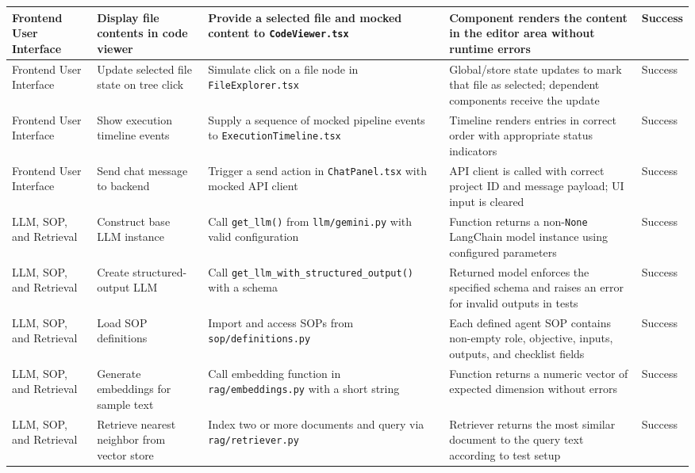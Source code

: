\begin{longtable}{|p{3.0cm}|p{3.8cm}|p{3.8cm}|p{4.6cm}|>{\centering\arraybackslash}p{1.8cm}|}
\hline
Frontend User Interface & Display file contents in code viewer & Provide a selected file and mocked content to \texttt{CodeViewer.tsx} & Component renders the content in the editor area without runtime errors & Success \\
\hline
Frontend User Interface & Update selected file state on tree click & Simulate click on a file node in \texttt{FileExplorer.tsx} & Global/store state updates to mark that file as selected; dependent components receive the update & Success \\
\hline
Frontend User Interface & Show execution timeline events & Supply a sequence of mocked pipeline events to \texttt{ExecutionTimeline.tsx} & Timeline renders entries in correct order with appropriate status indicators & Success \\
\hline
Frontend User Interface & Send chat message to backend & Trigger a send action in \texttt{ChatPanel.tsx} with mocked API client & API client is called with correct project ID and message payload; UI input is cleared & Success \\
\hline
LLM, SOP, and Retrieval & Construct base LLM instance & Call \texttt{get\_\allowbreak{}llm()} from \texttt{llm/\allowbreak{}gemini.py} with valid configuration & Function returns a non-\texttt{None} LangChain model instance using configured parameters & Success \\
\hline
LLM, SOP, and Retrieval & Create structured-output LLM & Call \texttt{get\_\allowbreak{}llm\_\allowbreak{}with\_\allowbreak{}}\linebreak\texttt{structured\_\allowbreak{}output()} with a schema & Returned model enforces the specified schema and raises an error for invalid outputs in tests & Success \\
\hline
LLM, SOP, and Retrieval & Load SOP definitions & Import and access SOPs from \texttt{sop/\allowbreak{}definitions.py} & Each defined agent SOP contains non-empty role, objective, inputs, outputs, and checklist fields & Success \\
\hline
LLM, SOP, and Retrieval & Generate embeddings for sample text & Call embedding function in \texttt{rag/\allowbreak{}embeddings.py} with a short string & Function returns a numeric vector of expected dimension without errors & Success \\
\hline
LLM, SOP, and Retrieval & Retrieve nearest neighbor from vector store & Index two or more documents and query via \texttt{rag/\allowbreak{}retriever.py} & Retriever returns the most similar document to the query text according to test setup & Success \\
\hline
\end{longtable}
\endgroup

